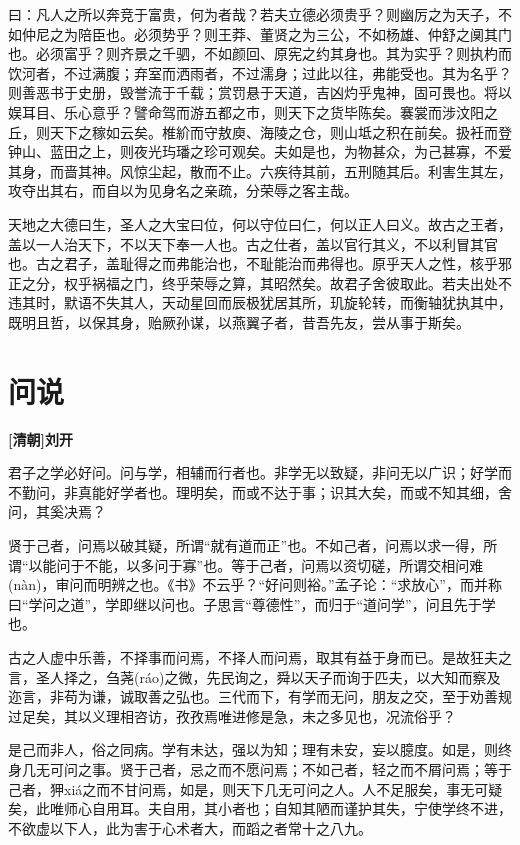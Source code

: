 \documentclass[UTF8,titlepage,oneside]{ctexbook}
\begin{document}
曰：凡人之所以奔竞于富贵，何为者哉？若夫立德必须贵乎？则幽厉之为天子，不如仲尼之为陪臣也。必须势乎？则王莽、董贤之为三公，不如杨雄、仲舒之阒其门也。必须富乎？则齐景之千驷，不如颜回、原宪之约其身也。其为实乎？则执杓而饮河者，不过满腹；弃室而洒雨者，不过濡身；过此以往，弗能受也。其为名乎？则善恶书于史册，毁誉流于千载；赏罚悬于天道，吉凶灼乎鬼神，固可畏也。将以娱耳目、乐心意乎？譬命驾而游五都之市，则天下之货毕陈矣。褰裳而涉汶阳之丘，则天下之稼如云矣。椎紒而守敖庾、海陵之仓，则山坻之积在前矣。扱衽而登钟山、蓝田之上，则夜光玙璠之珍可观矣。夫如是也，为物甚众，为己甚寡，不爱其身，而啬其神。风惊尘起，散而不止。六疾待其前，五刑随其后。利害生其左，攻夺出其右，而自以为见身名之亲疏，分荣辱之客主哉。

天地之大德曰生，圣人之大宝曰位，何以守位曰仁，何以正人曰义。故古之王者，盖以一人治天下，不以天下奉一人也。古之仕者，盖以官行其义，不以利冒其官也。古之君子，盖耻得之而弗能治也，不耻能治而弗得也。原乎天人之性，核乎邪正之分，权乎祸福之门，终乎荣辱之算，其昭然矣。故君子舍彼取此。若夫出处不违其时，默语不失其人，天动星回而辰极犹居其所，玑旋轮转，而衡轴犹执其中，既明且哲，以保其身，贻厥孙谋，以燕翼子者，昔吾先友，尝从事于斯矣。


\chapter*{问说}
\begin{center}
	\textbf{[清朝]刘开}
\end{center}

君子之学必好问。问与学，相辅而行者也。非学无以致疑，非问无以广识；好学而不勤问，非真能好学者也。理明矣，而或不达于事；识其大矣，而或不知其细，舍问，其奚决焉？

贤于己者，问焉以破其疑，所谓“就有道而正”也。不如己者，问焉以求一得，所谓“以能问于不能，以多问于寡”也。等于己者，问焉以资切磋，所谓交相问难(nàn)，审问而明辨之也。《书》不云乎？“好问则裕。”孟子论：“求放心”，而并称曰“学问之道”，学即继以问也。子思言“尊德性”，而归于“道问学”，问且先于学也。

古之人虚中乐善，不择事而问焉，不择人而问焉，取其有益于身而已。是故狂夫之言，圣人择之，刍荛(ráo)之微，先民询之，舜以天子而询于匹夫，以大知而察及迩言，非苟为谦，诚取善之弘也。三代而下，有学而无问，朋友之交，至于劝善规过足矣，其以义理相咨访，孜孜焉唯进修是急，未之多见也，况流俗乎？

是己而非人，俗之同病。学有未达，强以为知；理有未安，妄以臆度。如是，则终身几无可问之事。贤于己者，忌之而不愿问焉；不如己者，轻之而不屑问焉；等于己者，狎xiá之而不甘问焉，如是，则天下几无可问之人。人不足服矣，事无可疑矣，此唯师心自用耳。夫自用，其小者也；自知其陋而谨护其失，宁使学终不进，不欲虚以下人，此为害于心术者大，而蹈之者常十之八九。
\end{document}
